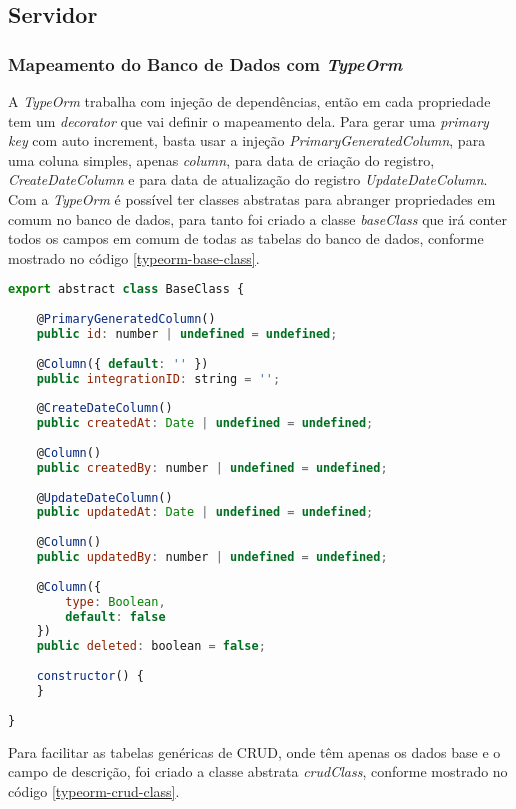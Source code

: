 \subsection{Servidor}
\subsubsection{Mapeamento do Banco de Dados com \textit{TypeOrm}}

A \textit{TypeOrm} trabalha com injeção de dependências, então em cada propriedade tem um \textit{decorator} que vai definir o mapeamento dela. Para gerar uma \textit{primary key} com auto increment, basta usar a injeção \textit{PrimaryGeneratedColumn}, para uma coluna simples, apenas \textit{column}, para data de criação do registro, \textit{CreateDateColumn} e para data de atualização do registro \textit{UpdateDateColumn}.
Com a \textit{TypeOrm} é possível ter classes abstratas para abranger propriedades em comum no banco de dados, para tanto foi criado a classe \textit{baseClass} que irá conter todos os campos em comum de todas as tabelas do banco de dados, conforme mostrado no código \ref{typeorm-base-class}.

\begin{lstlisting}[language=JavaScript, caption={BaseClass: Mapeamento de propriedades de tabelas do banco de dados}, label={typeorm-base-class}]
export abstract class BaseClass {
	
	@PrimaryGeneratedColumn()
	public id: number | undefined = undefined;
	
	@Column({ default: '' })
	public integrationID: string = '';
	
	@CreateDateColumn()
	public createdAt: Date | undefined = undefined;
	
	@Column()
	public createdBy: number | undefined = undefined;
	
	@UpdateDateColumn()
	public updatedAt: Date | undefined = undefined;
	
	@Column()
	public updatedBy: number | undefined = undefined;
	
	@Column({
		type: Boolean,
		default: false
	})
	public deleted: boolean = false;
	
	constructor() {
	}
	
}
\end{lstlisting}

Para facilitar as tabelas genéricas de CRUD, onde têm apenas os dados base e o campo de descrição, foi criado a classe abstrata \textit{crudClass}, conforme mostrado no código \ref{typeorm-crud-class}.

